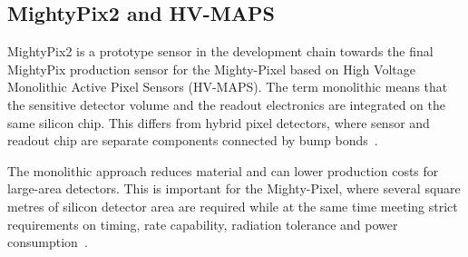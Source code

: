 \subsection{MightyPix2 and HV-MAPS}
MightyPix2 is a prototype sensor in the development chain towards the final MightyPix production sensor for the Mighty-Pixel based on High Voltage Monolithic Active Pixel Sensors (HV-MAPS). The term monolithic means that the sensitive detector volume and the readout electronics are integrated on the same silicon chip. This differs from hybrid pixel detectors, where sensor and readout chip are separate components connected by bump bonds~\cite{Schmitz2026-je}.\par
The monolithic approach reduces material and can lower production costs for large-area detectors. This is important for the Mighty-Pixel, where several square metres of silicon detector area are required while at the same time meeting strict requirements on timing, rate capability, radiation tolerance and power consumption~\cite{CERN-LHCC-2021-012}.
%

